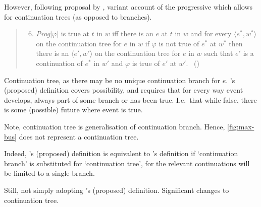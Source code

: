 \begin{note}
  However, following proposal by \citeauthor{Szabo:2004ul}, variant account of the progressive which allows for continuation trees (as opposed to branches).

  \begin{quote}
    \begin{enumerate}[label=(\Roman*), ref=(\Roman*)]
      \setcounter{enumi}{5}
    \item
      \emph{Prog}[\(\varphi\)] is true at \(t\) in \(w\) iff there is an \(e\) at \(t\) in \(w\) and for every \(\langle e^{\ast}, w^{\ast} \rangle\) on the continuation tree for \(e\) in \(w\) if \(\varphi\) is not true of \(e^{\ast}\) at \(w^{\ast}\) then there is an \(\langle e', w' \rangle\) on the continuation tree for \(e\) in \(w\) such that \(e'\) is a continuation of \(e^{\ast}\) in \(w'\) and \(\varphi\) is true of \(e'\) at \(w'\).%
      \mbox{ }\hfill\mbox{(\citeyear[37]{Szabo:2004ul})}
    \end{enumerate}
  \end{quote}

  Continuation tree, as there may be no unique continuation branch for \(e\).
  \citeauthor{Szabo:2004ul}'s (proposed) definition covers possibility, and requires that for every way event develops, always part of some branch or has been true.
  I.e.\ that while false, there is some (possible) future where event is true.

  Note, continuation tree is generalisation of continuation branch.
  Hence, \autoref{fig:max-bus} does not represent a continuation tree.

  Indeed, \citeauthor{Szabo:2004ul}'s (proposed) definition is equivalent to \citeauthor{Landman:1992wh}'s definition if `continuation branch' is substituted for `continuation tree', for the relevant continuations will be limited to a single branch.

  Still, not simply adopting \citeauthor{Szabo:2004ul}'s (proposed) definition.
  Significant changes to continuation tree.
\end{note}

